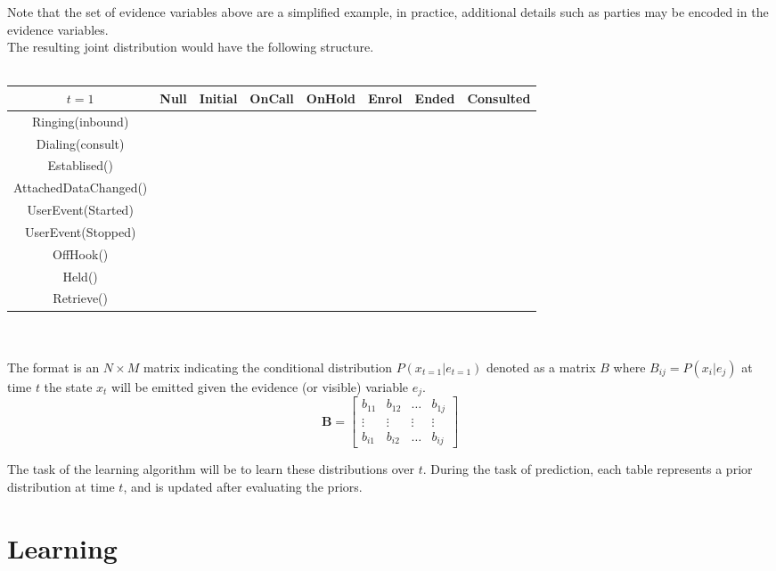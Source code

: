 \documentclass[11pt]{article}
\begin{document}
Note that the set of evidence variables above are a simplified example, in practice, additional details such as parties may be encoded in the evidence variables.\\
The resulting joint distribution would have the following structure.
\\\\
\begin{tabular}{|c|c|c|c|c|c|c|c|}
\hline
$t=1$ & Null & Initial & OnCall & OnHold & Enrol & Ended & Consulted \\
\hline
Ringing(inbound) & & & & & & & \\
\hline 
Dialing(consult) & & & & & & & \\
\hline 
Establised() & & & & & & & \\
\hline 
AttachedDataChanged() & & & & & & & \\
\hline
UserEvent(Started) & & & & & & & \\
\hline
UserEvent(Stopped) & & & & & & & \\
\hline
OffHook() & & & & & & & \\
\hline
Held() & & & & & & & \\
\hline
Retrieve() & & & & & & & \\
\hline
\end{tabular}
\\\\
The format is an $N \times M$ matrix indicating the conditional distribution $P(x_{t=1} | e_{t=1})$ denoted as a matrix $B$ where $B_{ij} = P(x_i | e_j )$ at time $t$ the state $x_t$ will be emitted given the evidence (or visible) variable $e_j$. \cite{pc}
\begin{equation*}
    \mathbf{B} = \left[
    \begin{array}{cccc}
    b_{11} & b_{12} & \ldots & b_{1j} \\
    \vdots & \vdots & \vdots & \vdots \\
    b_{i1} & b_{i2} & \ldots & b_{ij}
   
    \end{array}
    \right]
\end{equation*}

The task of the learning algorithm will be to learn these distributions over $t$. During the task of prediction, each table represents a prior distribution at time $t$, and is updated after evaluating the priors.


\section{Learning}
\end{document}
